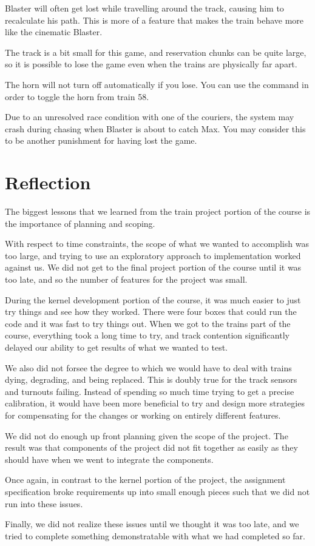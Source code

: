 \documentclass[pdftex,10pt,a4paper]{article}
\begin{document}
Blaster will often get lost while travelling around the track,
causing him to recalculate his path. This is more of a feature that
makes the train behave more like the cinematic Blaster.

The track is a bit small for this game, and reservation chunks can be
quite large, so it is possible to lose the game even when the trains
are physically far apart.

The horn will not turn off automatically if you lose. You can use the
command  in order to toggle the horn from train 58.

Due to an unresolved race condition with one of the couriers, the
system may crash during chasing when Blaster is about to catch
Max. You may consider this to be another punishment for having lost
the game.

\section*{Reflection}

The biggest lessons that we learned from the train project portion of
the course is the importance of planning and scoping.

With respect to time constraints, the scope of what we wanted to
accomplish was too large, and trying to use an exploratory approach to
implementation worked against us. We did not get to the final project
portion of the course until it was too late, and so the number of
features for the project was small.

During the kernel development portion of the course, it was much
easier to just try things and see how they worked. There were four
boxes that could run the code and it was fast to try things out. When
we got to the trains part of the course, everything took a long time
to try, and track contention significantly delayed our ability to get
results of what we wanted to test.

We also did not forsee the degree to which we would have to deal with
trains dying, degrading, and being replaced. This is doubly true for
the track sensors and turnouts failing. Instead of spending so much
time trying to get a precise calibration, it would have been more
beneficial to try and design more strategies for compensating for the
changes or working on entirely different features.

We did not do enough up front planning given the scope of the
project. The result was that components of the project did not fit
together as easily as they should have when we went to integrate the
components.

Once again, in contrast to the kernel portion of the project, the
assignment specification broke requirements up into small enough
pieces such that we did not run into these issues.

Finally, we did not realize these issues until we thought it was too
late, and we tried to complete something demonstratable with what we
had completed so far.
\end{document}
